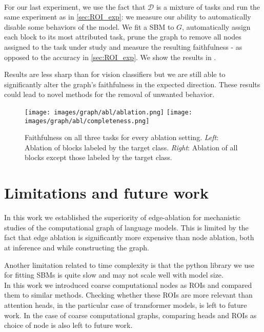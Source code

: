 \documentclass{article}
\begin{document}
\paragraph{}For our last experiment, we use the fact that $\mathcal{D}$ is a mixture of tasks and run the same experiment as in \cref{sec:ROI_exp}: we measure our ability to automatically disable some behaviors of the model. We fit a SBM to $G$, automatically assign each block to its most attributed task, prune the graph to remove all nodes assigned to the task under study and measure the resulting faithfulness - as opposed to the accuracy in \cref{sec:ROI_exp}. We show the results in .

Results are less sharp than for vision classifiers but we are still able to significantly alter the graph's faithfulness in the expected direction. These results could lead to novel methods for the removal of unwanted behavior.

\begin{figure}[h]
    \centering
    \texttt{[image: images/graph/abl/ablation.png]}
    \hspace{1em}
    \texttt{[image: images/graph/abl/completeness.png]}
    \caption{Faithfulness on all three tasks for every ablation setting. \textit{Left}: Ablation of blocks labeled by the target class. \textit{Right}: Ablation of all blocks except those labeled by the target class.}
    \label{fig:across_task_faithfulness}
\end{figure}

\section{Limitations and future work}
\label{sec:future}

In this work we established the superiority of edge-ablation for mechanistic studies of the computational graph of language models. This is limited by the fact that edge ablation is significantly more expensive than node ablation, both at inference and while constructing the graph.

Another limitation related to time complexity is that the python library we use for fitting SBMs is quite slow and may not scale well with model size.\\

In this work we introduced coarse computational nodes as ROIs and compared them to similar methods. Checking whether these ROIs are more relevant than attention heads, in the particular case of transformer models, is left to future work. In the case of coarse computational graphs, comparing heads and ROIs as choice of node is also left to future work.
\end{document}
